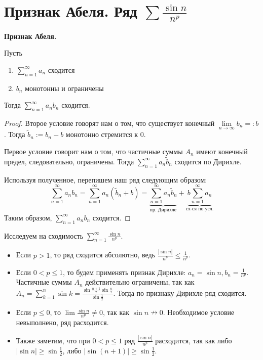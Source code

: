 \section{Признак Абеля. Ряд $\sum \frac{\sin n}{n^p}$}
\textbf{Признак Абеля.} 

Пусть \begin{enumerate}
    \item $\sum\limits_{n=1}^\infty a_n$ сходится
    \item $b_n$ монотонны и ограничены
\end{enumerate}
Тогда $\sum\limits_{n=1}^\infty a_nb_n$ сходится.
\begin{proof}
    Второе условие говорят нам о том, что существует конечный $\lim\limits_{n \to \infty} b_n =: b$.
    Тогда $\widetilde{b}_n := b_n - b$ монотонно стремится к 0.

    \quad Первое условие говорит нам о том, что частичные суммы $A_n$ имеют конечный предел, следовательно, ограничены.
    Тогда $\sum\limits_{n=1}^\infty a_n\widetilde{b}_n$ сходится по Дирихле.

    \quad Используя полученное, перепишем наш ряд следующим образом: \[ \sum_{n=1}^\infty a_nb_n = \sum_{n=1}^\infty a_n(\widetilde{b}_n + b) = \underbrace{\sum_{n=1}^\infty a_n\widetilde{b}_n}_{\text{пр. Дирихле}} + \underbrace{b\sum_{n=1}^\infty a_n}_{\text{сх-ся по усл.}} \]
    \quad Таким образом, $\sum\limits_{n=1}^\infty a_nb_n$ сходится.
\end{proof}

\vspace{4mm}

\begin{example}
    Исследуем на сходимость $\sum\limits_{n=1}^\infty \frac{\sin n}{n^p}$.
    \begin{itemize}
        \item Если $p > 1$, то ряд сходится абсолютно, ведь $\frac{|\sin n|}{n^p} \leqslant \frac{1}{n^p}$.
        \item Если $0 < p \leqslant 1$, то будем применять признак Дирихле: $a_n = \sin n, b_n = \frac{1}{n^p}$. 
        Частичные суммы $A_n$ действительно ограничены, так как $A_n = \sum\limits_{k=1}^n \sin k = \frac{\sin \frac{n+1}{2}\sin \frac{n}{2}}{\sin \frac{1}{2}}$. Тогда по признаку Дирихле ряд сходится.
        \item Если $p \leqslant 0$, то $\lim \frac{\sin n}{n^p} \neq 0$, так как $\sin n \nrightarrow 0$. Необходимое условие невыполнено, ряд расходится.
        \item Также заметим, что при $0 < p \leqslant 1$ ряд $\frac{|\sin n|}{n^p}$ расходится, так как либо $|\sin n| \geqslant \sin \frac{1}{2}$, либо $|\sin (n+1)| \geqslant \sin \frac{1}{2}$.
    \end{itemize}
\end{example}
